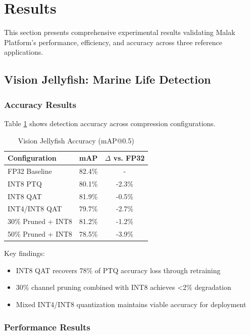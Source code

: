 \section{Results}

This section presents comprehensive experimental results validating Malak Platform's performance, efficiency, and accuracy across three reference applications.

\subsection{Vision Jellyfish: Marine Life Detection}

\subsubsection{Accuracy Results}

Table \ref{tab:jellyfish_accuracy} shows detection accuracy across compression configurations.

\begin{table}[h]
\centering
\caption{Vision Jellyfish Accuracy (mAP@0.5)}
\label{tab:jellyfish_accuracy}
\begin{tabular}{lcc}
\hline
\textbf{Configuration} & \textbf{mAP} & \textbf{$\Delta$ vs. FP32} \\
\hline
FP32 Baseline & 82.4\% & - \\
INT8 PTQ & 80.1\% & -2.3\% \\
INT8 QAT & 81.9\% & -0.5\% \\
INT4/INT8 QAT & 79.7\% & -2.7\% \\
30\% Pruned + INT8 & 81.2\% & -1.2\% \\
50\% Pruned + INT8 & 78.5\% & -3.9\% \\
\hline
\end{tabular}
\end{table}

Key findings:
\begin{itemize}
\item INT8 QAT recovers 78\% of PTQ accuracy loss through retraining
\item 30\% channel pruning combined with INT8 achieves <2\% degradation
\item Mixed INT4/INT8 quantization maintains viable accuracy for deployment
\end{itemize}

\subsubsection{Performance Results}

